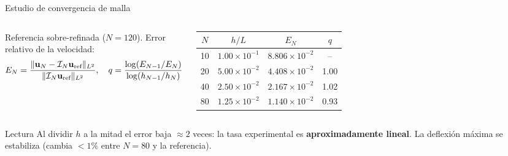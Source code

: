 \begin{frame}{Estudio de convergencia de malla}
  \begin{columns}[T]
      \small
      Referencia sobre-refinada ($N=120$). Error relativo de la velocidad:
      \[
        E_N = \frac{\|\mathbf{u}_N - \mathcal{I}_N\mathbf{u}_{\text{ref}}\|_{L^2}}{\|\mathcal{I}_N\mathbf{u}_{\text{ref}}\|_{L^2}},
        \quad
        q = \frac{\log(E_{N-1}/E_N)}{\log(h_{N-1}/h_N)}
      \]
      \centering
      \footnotesize
      \begin{tabular}{cccc}
        \toprule
        $N$ & $h/L$ & $E_N$ & $q$ \\
        \midrule
        10 & $1.00\times10^{-1}$ & $8.806\times10^{-2}$ & -- \\
        20 & $5.00\times10^{-2}$ & $4.408\times10^{-2}$ & 1.00 \\
        40 & $2.50\times10^{-2}$ & $2.167\times10^{-2}$ & 1.02 \\
        80 & $1.25\times10^{-2}$ & $1.140\times10^{-2}$ & 0.93 \\
        \bottomrule
      \end{tabular}
      \centering
  \end{columns}
  \vspace{0.2em}
  \begin{block}{Lectura}
    \small Al dividir $h$ a la mitad el error baja $\approx 2$ veces: la tasa experimental es \textbf{aproximadamente lineal}. La deflexión máxima se estabiliza (cambia $<1\%$ entre $N=80$ y la referencia).
  \end{block}
\end{frame}
